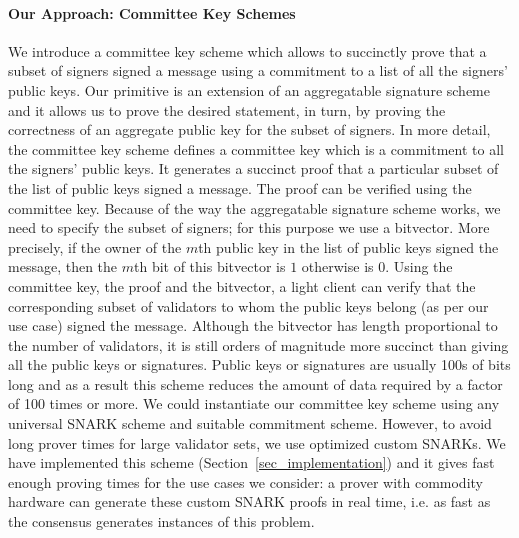 \paragraph{Our Approach: Committee Key Schemes} We introduce a committee key scheme which allows to succinctly prove that a subset of signers 
signed a message using a commitment to a list of all the signers' public keys. Our primitive is an extension of an aggregatable signature scheme and 
it allows us to prove the desired statement, in turn, by proving the correctness of an aggregate public key for the subset of signers. 
In more detail, the committee key scheme defines a committee key which is a commitment to all the signers' public keys. It generates a succinct proof that a particular subset of the list of public keys signed a message. The proof can be verified using the committee key. 
Because of the way the aggregatable signature scheme works, we need to specify the subset of signers; for this purpose we use a bitvector. 
More precisely, if the owner of the $m$th public key in the list of public keys signed the message, then the $m$th bit of this bitvector is $1$ otherwise is $0$.
Using the committee key, the proof and the bitvector, a light client can verify that the corresponding subset of validators to whom the 
public keys belong (as per our use case) signed the message. Although the bitvector has length proportional to the number of validators, it is still orders of magnitude 
more succinct than giving all the public keys or signatures. Public keys or signatures are usually 100s of bits long and as a result this scheme reduces the amount of 
data required by a factor of 100 times or more. We could instantiate our committee key scheme using any universal SNARK scheme and suitable commitment scheme. 
However, to avoid long prover times for large validator sets, we use optimized custom SNARKs. We have implemented this scheme 
(Section~\ref{sec_implementation}) and it gives fast enough proving times for the use cases we consider: a prover with 
commodity hardware can generate these custom SNARK proofs in real time, i.e. as fast as the consensus generates instances of this problem.

\vspace{-0.2cm}
